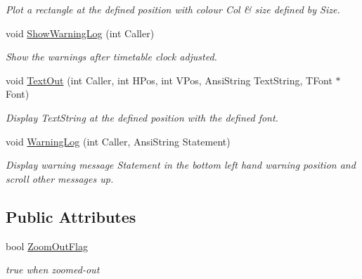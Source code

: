 \begin{DoxyCompactItemize}
\begin{DoxyCompactList}\small\item\em Plot a rectangle at the defined position with colour Col \& size defined by Size. \end{DoxyCompactList}\item 
\mbox{\label{class_t_display_aece63da07b7586b62115eeb81c7e2b57}} 
void \mbox{\hyperlink{class_t_display_aece63da07b7586b62115eeb81c7e2b57}{Show\+Warning\+Log}} (int Caller)
\begin{DoxyCompactList}\small\item\em Show the warnings after timetable clock adjusted. \end{DoxyCompactList}\item 
\mbox{\label{class_t_display_adfff17bfef798b07b1e6bbfc6f5e0822}} 
void \mbox{\hyperlink{class_t_display_adfff17bfef798b07b1e6bbfc6f5e0822}{Text\+Out}} (int Caller, int H\+Pos, int V\+Pos, Ansi\+String Text\+String, T\+Font $\ast$Font)
\begin{DoxyCompactList}\small\item\em Display Text\+String at the defined position with the defined font. \end{DoxyCompactList}\item 
\mbox{\label{class_t_display_a604d491a723df459bdcd54a4b9d1d9f2}} 
void \mbox{\hyperlink{class_t_display_a604d491a723df459bdcd54a4b9d1d9f2}{Warning\+Log}} (int Caller, Ansi\+String Statement)
\begin{DoxyCompactList}\small\item\em Display warning message Statement in the bottom left hand warning position and scroll other messages up. \end{DoxyCompactList}\end{DoxyCompactItemize}
\subsection*{Public Attributes}
\begin{DoxyCompactItemize}
\item 
\mbox{\label{class_t_display_a0ce29cc370b43313ff15bee9423bf338}} 
bool \mbox{\hyperlink{class_t_display_a0ce29cc370b43313ff15bee9423bf338}{Zoom\+Out\+Flag}}
\begin{DoxyCompactList}\small\item\em true when zoomed-\/out \end{DoxyCompactList}\end{DoxyCompactItemize}
